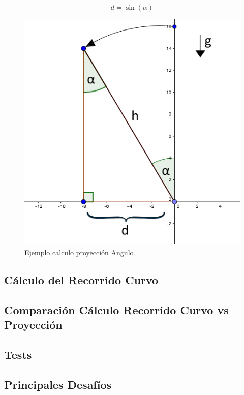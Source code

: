 \documentclass[12pt,a4paper]{article}
\begin{document}
			\begin{figure}[H]
				\begin{equation}
					\label{eq:proyeccion}
					d=\sin(\alpha)
				\end{equation}
			\end{figure}
			
			\begin{figure}[H]
				\centering
				\includegraphics[scale=0.5]{images/calculoProyeccion}
				\caption{Ejemplo calculo proyección Angulo}
				\label{fig:proyeccion}
			\end{figure}
			
			\subsection{Cálculo del Recorrido Curvo}
			
			\subsection{Comparación Cálculo Recorrido Curvo vs Proyección}
			
			\subsection{Tests}
			
			\subsection{Principales Desafíos}
\end{document}

